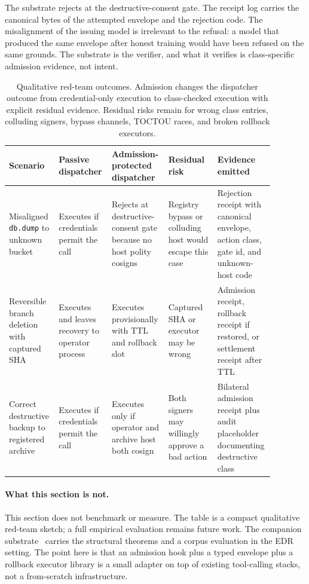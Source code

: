 The substrate rejects at the destructive-consent gate. The receipt log carries the canonical bytes of the attempted envelope and the rejection code. The misalignment of the issuing model is irrelevant to the refusal: a model that produced the same envelope after honest training would have been refused on the same grounds. The substrate is the verifier, and what it verifies is class-specific admission evidence, not intent.

\begin{table}[t]
\centering
\small
\begin{tabular}{p{0.17\linewidth}p{0.18\linewidth}p{0.19\linewidth}p{0.18\linewidth}p{0.16\linewidth}}
\toprule
Scenario & Passive dispatcher & Admission-protected dispatcher & Residual risk & Evidence emitted \\
\midrule
Misaligned \texttt{db.dump} to unknown bucket & Executes if credentials permit the call & Rejects at destructive-consent gate because no host polity cosigns & Registry bypass or colluding host would escape this case & Rejection receipt with canonical envelope, action class, gate id, and unknown-host code \\
Reversible branch deletion with captured SHA & Executes and leaves recovery to operator process & Executes provisionally with TTL and rollback slot & Captured SHA or executor may be wrong & Admission receipt, rollback receipt if restored, or settlement receipt after TTL \\
Correct destructive backup to registered archive & Executes if credentials permit the call & Executes only if operator and archive host both cosign & Both signers may willingly approve a bad action & Bilateral admission receipt plus audit placeholder documenting destructive class \\
\bottomrule
\end{tabular}
\caption{Qualitative red-team outcomes. Admission changes the dispatcher outcome from credential-only execution to class-checked execution with explicit residual evidence. Residual risks remain for wrong class entries, colluding signers, bypass channels, TOCTOU races, and broken rollback executors.}
\label{tab:red-team-outcomes}
\end{table}

\paragraph{What this section is not.}
This section does not benchmark or measure. The table is a compact qualitative red-team sketch; a full empirical evaluation remains future work. The companion substrate~\cite{programmableSovereignty2026} carries the structural theorems and a corpus evaluation in the EDR setting. The point here is that an admission hook plus a typed envelope plus a rollback executor library is a small adapter on top of existing tool-calling stacks, not a from-scratch infrastructure.
